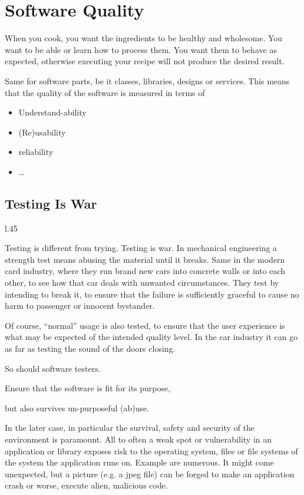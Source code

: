 \documentclass[\docroot/main]{subfiles}
\begin{document}
\section{Software Quality}
When you cook, you want the ingredients to be healthy and wholesome.
You want to be able or learn how to process them. You want them to
behave as expected, otherwise executing your recipe will not  produce
the desired result. 

Same for software parts, be it classes, libraries, designs or services.
This means that the quality of the software is measured in terms of
\begin{itemize}
\item Understand-ability
\item (Re)usability
\item reliability
\item \ldots
\end{itemize}

\subsection{Testing Is War}
\begin{wrapfigure}{l}{.45\textwidth}
\end{wrapfigure}
Testing is different from trying. Testing is war. In mechanical
engineering a strength test means abusing the material until it breaks. Same in the
modern card industry, where they run brand new cars into concrete walls
or into each other, to see how that car deals with unwanted circumstances.
They test by intending to break it, to ensure that the failure is
sufficiently graceful to cause no harm to passenger or innocent bystander.

Of course, ``normal'' usage is also tested, to ensure that the user
experience is what may be expected of the intended quality level. In
the car industry it can go as far as testing the sound of the doors closing.

So should software testers. 
\begin{itemize*}
\item Ensure that the software is fit for its
purpose,
\item but also survives un-purposeful (ab)use.
\end{itemize*}
In the later case, in particular the survival, safety and security of the environment is
paramount. All to often a weak spot or vulnerability in an
application or library exposes risk to the operating system, files or
file systems of the system the application runs on. Example are
numerous. It might come unexpected, but a picture (e.g. a jpeg file)
can be forged to make an application crash or worse, execute alien, malicious code.
\end{document}
